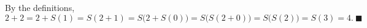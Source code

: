 By the definitions,
\[2+2=2+S(1)=S(2+1)=S\bigl(2+S(0)\bigr)=S\bigl(S(2+0)\bigr)=S\bigl(S(2)\bigr)=S(3)=4.\ \blacksquare\]
